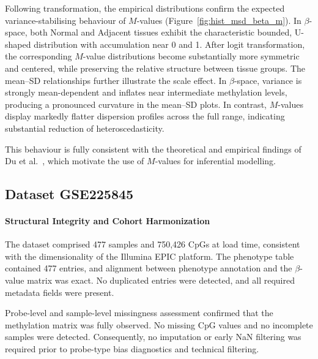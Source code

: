 Following transformation, the empirical distributions confirm the expected variance-stabilising behaviour of $M$-values (Figure~\ref{fig:hist_msd_beta_m}). In $\beta$-space, both Normal and Adjacent tissues exhibit the characteristic bounded, U-shaped distribution with accumulation near 0 and 1. After logit transformation, the corresponding $M$-value distributions become substantially more symmetric and centered, while preserving the relative structure between tissue groups.
The mean–SD relationships further illustrate the scale effect. In $\beta$-space, variance is strongly mean-dependent and inflates near intermediate methylation levels, producing a pronounced curvature in the mean–SD plots. In contrast, $M$-values display markedly flatter dispersion profiles across the full range, indicating substantial reduction of heteroscedasticity. 

This behaviour is fully consistent with the theoretical and empirical findings of Du et al.~\cite{Du2010}, which motivate the use of $M$-values for inferential modelling.



\subsection{Dataset GSE225845}
\label{subsec:gse225845_preproc}

\paragraph{Structural Integrity and Cohort Harmonization}
\label{par:gse225845_step0}

The dataset comprised 477 samples and 750{,}426 CpGs at load time, consistent with the dimensionality of the Illumina EPIC platform.  
The phenotype table contained 477 entries, and alignment between phenotype annotation and the $\beta$-value matrix was exact. No duplicated entries were detected, and all required metadata fields were present.

Probe-level and sample-level missingness assessment confirmed that the methylation matrix was fully observed.  
No missing CpG values and no incomplete samples were detected. Consequently, no imputation or early NaN filtering was required prior to probe-type bias diagnostics and technical filtering.


